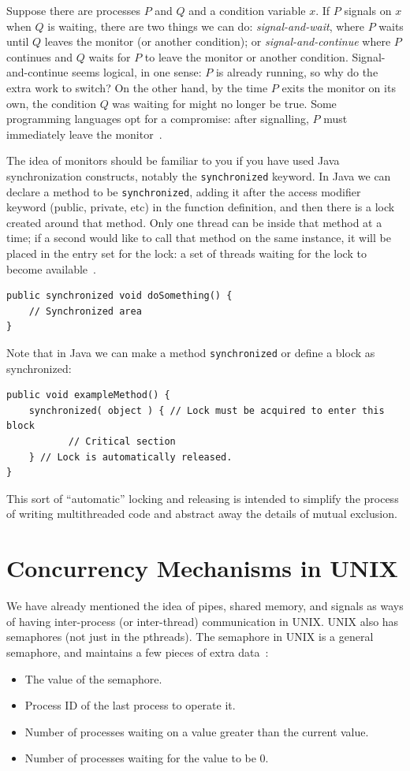 Suppose there are processes $P$ and $Q$ and a condition variable $x$. If $P$ signals on $x$ when $Q$ is waiting, there are two things we can do: \textit{signal-and-wait}, where $P$ waits until $Q$ leaves the monitor (or another condition); or \textit{signal-and-continue} where $P$ continues and $Q$ waits for $P$ to leave the monitor or another condition. Signal-and-continue seems logical, in one sense: $P$ is already running, so why do the extra work to switch? On the other hand, by the time $P$ exits the monitor on its own, the condition $Q$ was waiting for might no longer be true. Some programming languages opt for a compromise: after signalling, $P$ must immediately leave the monitor~\cite{osc}.

The idea of monitors should be familiar to you if you have used Java synchronization constructs, notably the \texttt{synchronized} keyword. In Java we can declare a method to be \texttt{synchronized}, adding it after the access modifier keyword (public, private, etc) in the function definition, and then there is a lock created around that method. Only one thread can be inside that method at a time; if a second would like to call that method on the same instance, it will be placed in the entry set for the lock: a set of threads waiting for the lock to become available~\cite{osc}. 

\begin{verbatim}
public synchronized void doSomething() {
    // Synchronized area
}
\end{verbatim}


Note that in Java we can make a method \texttt{synchronized} or define a block as synchronized:

\begin{verbatim}
public void exampleMethod() {
    synchronized( object ) { // Lock must be acquired to enter this block
           // Critical section 
    } // Lock is automatically released.
}
\end{verbatim}

This sort of ``automatic'' locking and releasing is intended to simplify the process of writing multithreaded code and abstract away the details of mutual exclusion.

\section*{Concurrency Mechanisms in UNIX}

We have already mentioned the idea of pipes, shared memory, and signals as ways of having inter-process (or inter-thread) communication in UNIX. UNIX also has semaphores (not just in the pthreads). The semaphore in UNIX is a general semaphore, and maintains a few pieces of extra data~\cite{osi}:
\begin{itemize}
    \item The value of the semaphore.
    \item Process ID of the last process to operate it.
    \item Number of processes waiting on a value greater than the current value.
    \item Number of processes waiting for the value to be 0.
\end{itemize}

